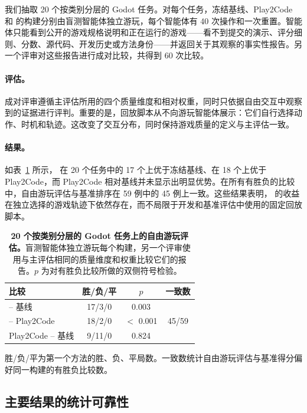 我们抽取 20 个按类别分层的 Godot 任务。对每个任务，冻结基线、Play2Code 和 \rsig{} 的构建分别由盲测智能体独立游玩，每个智能体有 40 次操作和一次重置。智能体只能看到公开的游戏规格说明和正在运行的游戏——看不到提交的演示、评分细则、分数、源代码、开发历史或方法身份——并返回关于其观察的事实性报告。另一个评审对这些报告进行成对比较，共得到 60 次比较。

\paragraph{评估。}成对评审遵循主评估所用的四个质量维度和相对权重，同时只依据自由交互中观察到的证据进行评判。重要的是，回放脚本从不向游玩智能体展示：它们自行选择动作、时机和轨迹。这改变了交互分布，同时保持游戏质量的定义与主评估一致。

\paragraph{结果。}如表~\ref{tab:freeplay} 所示，\rsig{} 在 20 个任务中的 17 个上优于冻结基线、在 18 个上优于 Play2Code，而 Play2Code 相对基线并未显示出明显优势。在所有有胜负的比较中，自由游玩评估与基准排序在 59 例中的 45 例上一致。这些结果表明，\rsig{} 的收益在独立选择的游戏轨迹下依然存在，而不局限于开发和基准评估中使用的固定回放脚本。

\begin{table}[htbp]
\caption{\textbf{20 个按类别分层的 Godot 任务上的自由游玩评估。}盲测智能体独立游玩每个构建，另一个评审使用与主评估相同的质量维度和权重比较它们的报告。$p$ 为对有胜负比较所做的双侧符号检验。}
\label{tab:freeplay}
\centering\small
\begin{tabular}{@{}lccc@{}}
\toprule
比较 & 胜/负/平 & $p$ & 一致数 \\
\midrule
\rsig{} – 基线 & 17/3/0 & 0.003 & \multirow{3}{*}{45/59} \\
\rsig{} – Play2Code & 18/2/0 & $<$ 0.001 & \\
Play2Code – 基线 & 9/11/0 & 0.824 & \\
\bottomrule
\end{tabular}

\vspace{2pt}
\parbox{0.85\linewidth}{\footnotesize 胜/负/平为第一个方法的胜、负、平局数。一致数统计自由游玩评估与基准得分偏好同一构建的有胜负比较数。}
\end{table}

\subsection{主要结果的统计可靠性}\label{app:stat}
